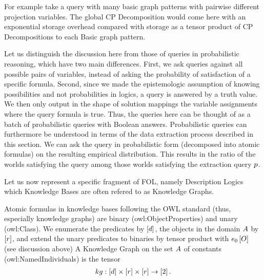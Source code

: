 \begin{example}
	For example take a query with many basic graph patterns with pairwise different projection variables. 
	The global CP Decomposition would come here with an exponential storage overhead compared with storage as a tensor product of CP Decompositions to each Basic graph pattern.
\end{example}


\begin{remark}
	Let us distinguish the discussion here from those of queries in probabilistic reasoning, which have two main differences.
	First, we ask queries against all possible pairs of variables, instead of asking the probability of satisfaction of a specific formula. 
	Second, since we made the epistemologic assumption of knowing possibilities and not probabilities in logics, a query is answered by a truth value.
	We then only output in the shape of solution mappings the variable assignments where the query formula is true.
 	Thus, the queries here can be thought of as a batch of probabilistic queries with Boolean answers.
	Probabilistic queries can furthermore be understood in terms of the data extraction process described in this section.
	We can ask the query in probabilistic form (decomposed into atomic formulas) on the resulting empirical distribution.
	This results in the ratio of the worlds satisfying the query among those worlds satisfying the extraction query $p$.
\end{remark}



Let us now represent a specific fragment of FOL, namely Description Logics which Knowledge Bases are often refered to as Knowledge Graphs.


Atomic formulas in knowledge bases following the OWL standard (thus, especially knowledge graphs) are binary (owl:ObjectProperties) and unary (owl:Class).
We enumerate the predicates by $[d]$, the objects in the domain $A$ by $[r]$, and extend the unary predicates to binaries by tensor product with $e_{0}\left[O\right]$ (see discussion above)
A Knowledge Graph on the set $A$ of constants (owl:NamedIndividuals) is the tensor
\begin{align*}
	kg :  [d] \times [r] \times [r] \rightarrow [2] \, . 
\end{align*}


